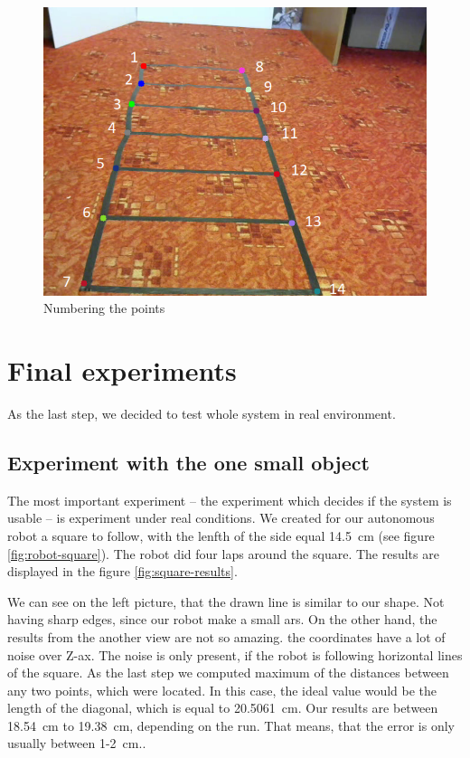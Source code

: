 \begin{figure}
\centering
\includegraphics[width=0.8\linewidth]{img/experiments/right-ladder-numbered.png}
\caption{Numbering the points}
\label{fig:ladder_numbered}
\end{figure}

\section{Final experiments}

As the last step, we decided to test whole system in real environment.

\subsection{Experiment with the one small object}

The most important experiment -- the experiment which decides if the system is
usable -- is experiment under real conditions. We created for our autonomous
robot a square to follow, with the lenfth of the side equal 14.5~cm (see figure
\ref{fig:robot-square}). The robot did four laps around the square. The
results are displayed in the figure \ref{fig:square-results}.

We can see on the left picture, that the drawn line is similar to our shape.
Not having sharp edges, since our robot make a small ars. On the other hand,
the results from the another view are not so amazing. the coordinates have a
lot of noise over Z-ax. The noise is only present, if the robot is following
horizontal lines of the square. As the last step we computed maximum of the
distances between any two points, which were located. In this case, the ideal
value would be the length of the diagonal, which is equal to 20.5061~cm. Our
results are between 18.54~cm to 19.38~cm, depending on the run. That means,
that the error is only usually between 1-2~cm..

